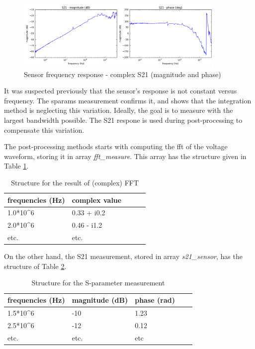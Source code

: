 \begin{figure}[!htbp]
  \centering
  \includegraphics[width=0.9\textwidth]{src/3/figures/s21_freq_response.png}
  \caption{Sensor frequency response - complex S21 (magnitude and phase)}
  \label{fig:s21-response-complex}
\end{figure}

It was suspected previously that the sensor's response is not constant versus frequency.
The \gls{sparams} measurement confirms it, and shows that the integration method is neglecting this variation.
Ideally, the goal is to measure with the largest bandwidth possible.
The S21 respone is used during post-processing to compensate this variation.

The post-processing methods starts with computing the \gls{fft} of the voltage waveform, storing it in array \textit{fft\_measure}.
This array has the structure given in Table \ref{tab:complex-fft}.

\begin{table}[!htbp]
  \centering
  \begin{tabular}{@{}lllll@{}}
  \toprule
  frequencies (Hz)        & complex value                \\ \midrule
  1.0*10^6                & 0.33 + i0.2                  \\
  2.0*10^6                & 0.46 - i1.2                  \\
  etc.                    & etc.                         \\ \bottomrule
  \end{tabular}
  \caption{Structure for the result of (complex) FFT}
  \label{tab:complex-fft}
\end{table}

On the other hand, the S21 measurement, stored in array \textit{s21\_sensor}, has the structure of Table \ref{tab:sparams}.

\begin{table}[!htbp]
  \centering
  \begin{tabular}{@{}lllll@{}}
  \toprule
  frequencies (Hz)          & magnitude (dB)         & phase (rad)     \\ \midrule
  1.5*10^6                  & -10                    & 1.23            \\
  2.5*10^6                  & -12                    & 0.12            \\
  etc.                      & etc.                   & etc             \\ \bottomrule
  \end{tabular}
  \caption{Structure for the S-parameter measurement}
  \label{tab:sparams}
\end{table}

